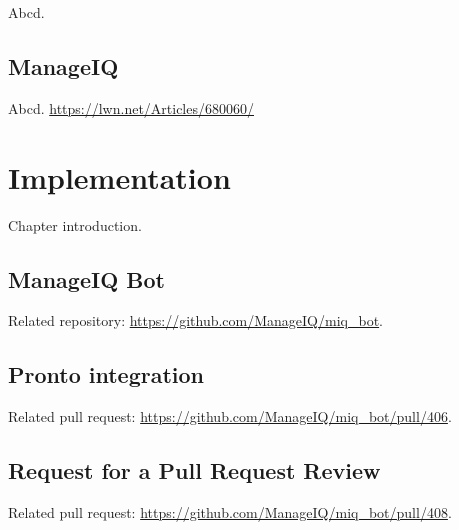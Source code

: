 Abcd.

\section{ManageIQ}

Abcd. \url{https://lwn.net/Articles/680060/}

\chapter{Implementation}

Chapter introduction.

\section{ManageIQ Bot}

Related repository: \url{https://github.com/ManageIQ/miq_bot}.

\section{Pronto integration}

Related pull request: \url{https://github.com/ManageIQ/miq_bot/pull/406}.

\section{Request for a Pull Request Review}

Related pull request: \url{https://github.com/ManageIQ/miq_bot/pull/408}.

